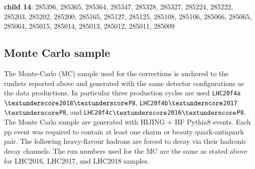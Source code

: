\begin{itemize}
	\textbf{child 14}: 285396, 285365, 285364, 285347, 285328, 285327, 285224, 285222, 285203, 285202, 285200, 285165, 285127, 285125, 285108, 285106, 285066, 285065, 285064, 285015, 285014, 285013, 285012, 285011, 285009


\end{itemize}

\subsection{Monte Carlo sample}
\label{sec:mc_sample}
The Monte-Carlo (MC) sample used for the corrections is anchored to the runlists reported above and generated with the same detector configurations as the data productions. In particular three production cycles are used  \texttt{LHC20f4a$\textunderscore$2018$\textunderscore$P8}, \texttt{LHC20f4b$\textunderscore$2017$\textunderscore$P8}, and \texttt{LHC20f4c$\textunderscore$2016$\textunderscore$P8}. The Monte Carlo sample are generated with HIJING + HF Pythia8 events. Each pp event was required to contain at least one charm or beauty quark-antiquark pair. The following heavy-flavour hadrons are forced to decay via their hadronic decay channels. The run numbers used for the MC are the same as stated above for LHC2016, LHC2017, and LHC2018 samples.    %



